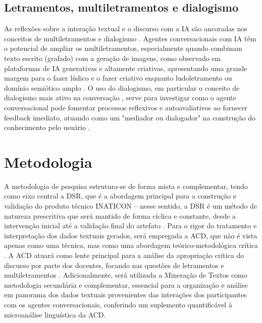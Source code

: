 \documentclass[portuguese]{textolivre}
\begin{document}
\subsection{Letramentos, multiletramentos e dialogismo}\label{sec-formato}
As reflexões sobre a interação textual e o discurso com a IA são ancoradas nos conceitos de multiletramentos \cite{rojo2012pedagogia} e dialogismo \cite{bakhtin2016generos}. Agentes conversacionais com IA têm o potencial de ampliar os multiletramentos, especialmente quando combinam texto escrito (grafado) com a geração de imagens, como observado em plataformas de IA generativas e altamente criativas, apresentando uma grande margem para o fazer lúdico e o fazer criativo enquanto ludoletramento \cite{zagal2010ludoliteracy} ou domínio semiótico amplo \cite{gee2004situated}. O uso do dialogismo, em particular o conceito de dialogismo mais ativo na conversação \cite{suleman2016negotiation}, serve para investigar como o agente conversacional pode fomentar processos reflexivos e autoavaliativos ao fornecer feedback imediato, atuando como um "mediador ou dialogador" na construção do conhecimento pelo usuário \cite{costa2009proposta,junior2017ontologias}.


\section{Metodologia}\label{sec-modelo}
A metodologia de pesquisa estrutura-se de forma mista e complementar, tendo como eixo central a DSR, que é a abordagem principal para a construção e validação do produto técnico INATICON – nesse sentido, a DSR é um método de natureza prescritiva que será mantido de forma cíclica e constante, desde a intervenção inicial até a validação final do artefato \cite{pimentel2020design,simon1988science}. Para o rigor do tratamento e interpretação dos dados textuais gerados, será empregada a ACD, que não é vista apenas como uma técnica, mas como uma abordagem teórico-metodológica crítica \cite{mesquita2020analise,queiroz2014analise}. A ACD atuará como lente principal para a análise da apropriação crítica do discurso por parte dos docentes, focando nas questões de letramentos e multiletramentos \cite{janks2010literacy,rojo2012pedagogia}. Adicionalmente, será utilizada a Mineração de Textos \cite{reategui2017apoio} como metodologia secundária e complementar, essencial para a organização e análise em panorama dos dados textuais provenientes das interações dos participantes com os agentes conversacionais, conferindo um suplemento quantificável à microanálise linguística da ACD.
\end{document}
